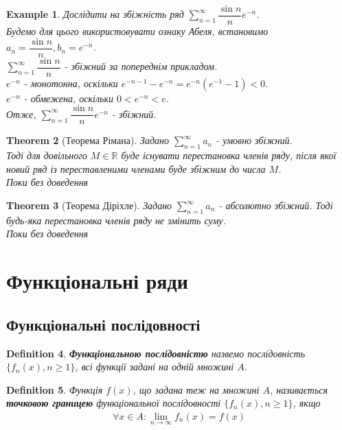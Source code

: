 \documentclass[a4paper, 10pt]{article}
\def\huge{\displaystyle}
\theoremstyle{theoremdd}
\newtheorem{theorem}{Theorem}[subsection]
\theoremstyle{theoremdd}
\newtheorem{definition}[theorem]{Definition}
\theoremstyle{theoremdd}
\theoremstyle{theoremdd}
\newtheorem{example}[theorem]{Example}
\theoremstyle{theoremdd}
\theoremstyle{theoremdd}
\theoremstyle{theoremdd}
\theoremstyle{theoremdd}
\begin{document}
\begin{example}
Дослідити на збіжність ряд $\huge\sum_{n=1}^\infty \dfrac{\sin n}{n} e^{-n}$.\\
Будемо для цього використовувати ознаку Абеля, встановимо $a_n = \dfrac{\sin n}{n}, b_n = e^{-n}$.\\
$\huge\sum_{n=1}^\infty \dfrac{\sin n}{n}$ - збіжний за попереднім прикладом.\\
$e^{-n}$ - монотонна, оскільки $e^{-n-1} - e^{-n} = e^{-n} (e^{-1} - 1) < 0$.\\
$e^{-n}$ - обмежена, оскільки $0 < e^{-n} < e$.\\
Отже, $\huge\sum_{n=1}^\infty \dfrac{\sin n}{n} e^{-n}$ - збіжний.
\end{example}

\begin{theorem}[Теорема Рімана]
Задано $\huge \sum_{n=1}^\infty a_n$ - умовно збіжний.\\
Тоді для довільного $M \in \mathbb{R}$ буде існувати перестановка членів ряду, після якої новий ряд із переставленими членами буде збіжним до числа $M$.\\
\textit{Поки без доведення}
\end{theorem}

\begin{theorem}[Теорема Діріхле]
Задано $\huge \sum_{n=1}^\infty a_n$ - абсолютно збіжний. Тоді будь-яка перестановка членів ряду не змінить суму.\\
\textit{Поки без доведення}
\end{theorem}
\newpage

\section{Функціональні ряди}
\subsection{Функціональні послідовності}
\begin{definition}
\textbf{Функціональною послідовністю} назвемо послідовність $\{f_n(x), n \geq 1 \}$, всі функції задані на одній множині $A$.
\end{definition}

\begin{definition}
Функція $f(x)$, що задана теж на множині $A$, називається \textbf{точковою границею} функціональної послідовності $\{f_n(x), n \geq 1\}$, якщо
\begin{align*}
\forall x \in A: \lim_{n \to \infty} f_n(x) = f(x)
\end{align*}
\end{definition}
\end{document}
